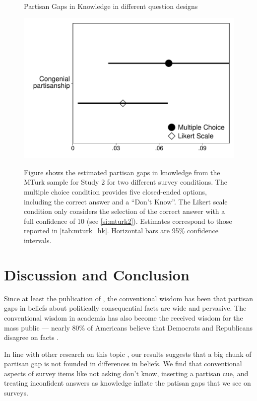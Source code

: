 \documentclass[12pt, letterpaper]{article}
\begin{document}
\begin{center}
	\begin{figure}[h]
		\centering
		\caption{Partisan Gaps in Knowledge in different question designs}
		\includegraphics[width=.55\textwidth]{../figs/mturk-hk-MC-LIKERT.pdf}
		\label{fig:mturk_hk}
		\caption*{\scriptsize
			Figure shows the estimated partisan gaps in knowledge from the MTurk sample for Study 2 for two different survey conditions.
			The multiple choice condition provides five closed-ended options, including the correct answer and a ``Don't Know''.
			The Likert scale condition only considers the selection of the correct answer with a full confidence of 10 (see \cref{si:mturk2}).
			Estimates correspond to those reported in \cref{tab:mturk_hk}.
			Horizontal bars are 95\% confidence intervals.
		}
	\end{figure}
\end{center}




\section*{Discussion and Conclusion}

Since at least the publication of \cite{bartels_2002}, the conventional wisdom has been that partisan gaps in beliefs about politically consequential facts are wide and pervasive. 
The conventional wisdom in academia has also become the received wisdom for the mass public --- nearly 80\% of Americans believe that Democrats and Republicans  disagree on facts \citep{pew2018disagree}.

In line with other research on this topic \citep[][though see \citeauthor{berinsky_2017} \citeyear{berinsky_2017} and \citeauthor{peterson_iyengar_forth} \citeyear{peterson_iyengar_forth}]{bullocketal_2015, prior2015you, schaffner_luks}, our results suggests that a big chunk of partisan gap is not founded in differences in beliefs. We find that conventional aspects of survey items like not asking don't know, inserting a partisan cue, and treating inconfident answers as knowledge inflate the patisan gaps that we see on surveys.
\end{document}
